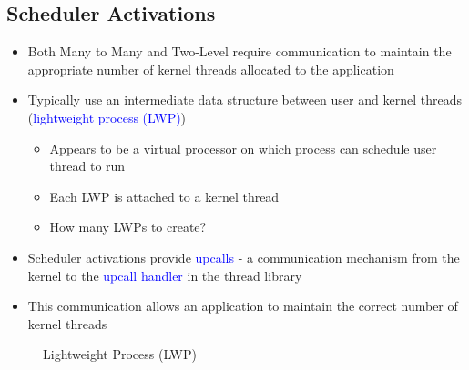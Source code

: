 \documentclass{book}
\begin{document}
            \subsection{Scheduler Activations}
                \begin{itemize}
                    \item Both Many to Many and Two-Level require communication to maintain the appropriate 
                    number of kernel threads allocated to the application
                    \item Typically use an intermediate data structure between user and kernel threads (\textcolor{blue}{lightweight process (LWP)})
                        \begin{itemize}
                            \item Appears to be a virtual processor on which process can schedule user thread to run
                            \item Each LWP is attached to a kernel thread
                            \item How many LWPs to create?
                        \end{itemize}
                    \item Scheduler activations provide \textcolor{blue}{upcalls} - a communication mechanism from the kernel
                    to the \textcolor{blue}{upcall handler} in the thread library
                    \item This communication allows an application to maintain the correct number of kernel threads
                \end{itemize}
                \begin{figure}[H]
                    \centering
                    \caption{Lightweight Process (LWP)}
                \end{figure}
\end{document}
